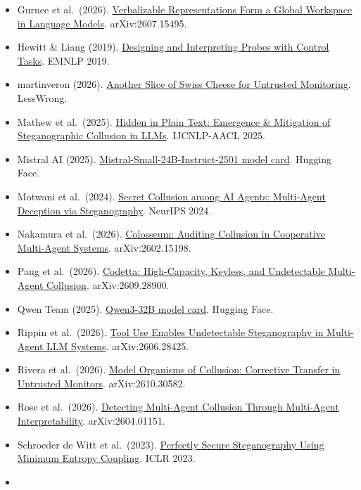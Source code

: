 \documentclass[11pt,letterpaper]{article}
\begin{document}
\begin{itemize}
\item
  Gurnee et al.~(2026). \href{https://arxiv.org/abs/2607.15495}{Verbalizable Representations Form a Global Workspace in Language Models}. arXiv:2607.15495.
\item
  Hewitt \& Liang (2019). \href{https://arxiv.org/abs/1909.03368}{Designing and Interpreting Probes with Control Tasks}. EMNLP 2019.
\item
  martinveron (2026). \href{https://www.lesswrong.com/posts/zJWgfsad8o9Y8E9sb/another-slice-of-swiss-cheese-for-untrusted-monitoring-1}{Another Slice of Swiss Cheese for Untrusted Monitoring}. LessWrong.
\item
  Mathew et al.~(2025). \href{https://arxiv.org/abs/2410.03768}{Hidden in Plain Text: Emergence \& Mitigation of Steganographic Collusion in LLMs}. IJCNLP-AACL 2025.
\item
  Mistral AI (2025). \href{https://huggingface.co/mistralai/Mistral-Small-24B-Instruct-2501}{Mistral-Small-24B-Instruct-2501 model card}. Hugging Face.
\item
  Motwani et al.~(2024). \href{https://arxiv.org/abs/2402.07510}{Secret Collusion among AI Agents: Multi-Agent Deception via Steganography}. NeurIPS 2024.
\item
  Nakamura et al.~(2026). \href{https://arxiv.org/abs/2602.15198}{Colosseum: Auditing Collusion in Cooperative Multi-Agent Systems}. arXiv:2602.15198.
\item
  Pang et al.~(2026). \href{https://arxiv.org/abs/2609.28900}{Codetta: High-Capacity, Keyless, and Undetectable Multi-Agent Collusion}. arXiv:2609.28900.
\item
  Qwen Team (2025). \href{https://huggingface.co/Qwen/Qwen3-32B}{Qwen3-32B model card}. Hugging Face.
\item
  Rippin et al.~(2026). \href{https://arxiv.org/abs/2606.28425}{Tool Use Enables Undetectable Steganography in Multi-Agent LLM Systems}. arXiv:2606.28425.
\item
  Rivera et al.~(2026). \href{https://arxiv.org/abs/2610.30582}{Model Organisms of Collusion: Corrective Transfer in Untrusted Monitors}. arXiv:2610.30582.
\item
  Rose et al.~(2026). \href{https://arxiv.org/abs/2604.01151}{Detecting Multi-Agent Collusion Through Multi-Agent Interpretability}. arXiv:2604.01151.
\item
  Schroeder de Witt et al.~(2023). \href{https://arxiv.org/abs/2210.14889}{Perfectly Secure Steganography Using Minimum Entropy Coupling}. ICLR 2023.
\item

\end{itemize}
\end{document}
